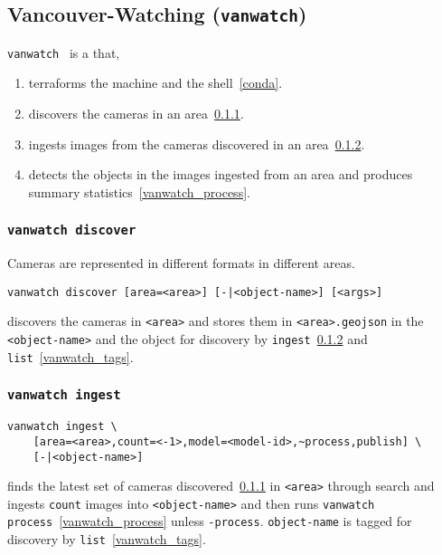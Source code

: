 \subsection{Vancouver-Watching (\texttt{vanwatch})}
\label{vanwatch}

\texttt{vanwatch}~ is a  that,
%
\begin{enumerate}
    \item{terraforms the machine and the shell~\ref{conda}.}
    \item{discovers the cameras in an area~\ref{vanwatch_discover}.}
    \item{ingests images from the cameras discovered in an area~\ref{vanwatch_ingest}.}
    \item{detects the objects in the images ingested from an area and produces summary statistics~\ref{vanwatch_process}.}
\end{enumerate}

\subsubsection{\texttt{vanwatch discover}}
\label{vanwatch_discover}

Cameras are represented in different formats in different areas.
%
\begin{verbatim}
vanwatch discover [area=<area>] [-|<object-name>] [<args>]
\end{verbatim}
%
discovers the cameras in \texttt{<area>} and stores them in \texttt{<area>.geojson} in the  \texttt{<object-name>} and  the object for discovery by \texttt{ingest}~\ref{vanwatch_ingest} and \texttt{list}~\ref{vanwatch_tags}. 

\subsubsection{\texttt{vanwatch ingest}}
\label{vanwatch_ingest}

\begin{verbatim}
vanwatch ingest \
    [area=<area>,count=<-1>,model=<model-id>,~process,publish] \
    [-|<object-name>]
\end{verbatim}
%
finds the latest set of cameras discovered~\ref{vanwatch_discover} in \texttt{<area>} through  search and ingests \texttt{count} images into \texttt{<object-name>} and then runs \texttt{vanwatch process}~\ref{vanwatch_process} unless \texttt{-process}. \texttt{object-name} is tagged for discovery by \texttt{list}~\ref{vanwatch_tags}. 

